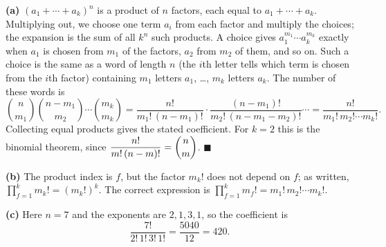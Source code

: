 \textbf{(a)} $(a_1+\cdots+a_k)^n$ is a product of $n$ factors, each equal to $a_1+\cdots+a_k$. Multiplying out, we choose one term $a_i$ from each factor and multiply the choices; the expansion is the sum of all $k^n$ such products. A choice gives $a_1^{m_1}\cdots a_k^{m_k}$ exactly when $a_1$ is chosen from $m_1$ of the factors, $a_2$ from $m_2$ of them, and so on. Such a choice is the same as a word of length $n$ (the $i$th letter tells which term is chosen from the $i$th factor) containing $m_1$ letters $a_1$, \ldots, $m_k$ letters $a_k$. The number of these words is
\[\binom{n}{m_1}\binom{n-m_1}{m_2}\cdots\binom{m_k}{m_k}=\dfrac{n!}{m_1!\,(n-m_1)!}\cdot\dfrac{(n-m_1)!}{m_2!\,(n-m_1-m_2)!}\cdots=\dfrac{n!}{m_1!\,m_2!\cdots m_k!}.\]
Collecting equal products gives the stated coefficient. For $k=2$ this is the binomial theorem, since $\dfrac{n!}{m!\,(n-m)!}=\dbinom nm$. $\blacksquare$

\textbf{(b)} The product index is $f$, but the factor $m_k!$ does not depend on $f$; as written, $\prod_{f=1}^k m_k!=(m_k!)^k$. The correct expression is $\prod_{f=1}^k m_f!=m_1!\,m_2!\cdots m_k!$.

\textbf{(c)} Here $n=7$ and the exponents are $2,1,3,1$, so the coefficient is
\[\dfrac{7!}{2!\,1!\,3!\,1!}=\dfrac{5040}{12}=\boxed{420}.\]
